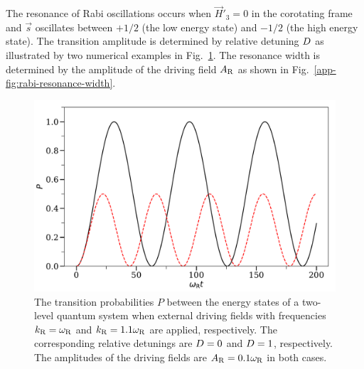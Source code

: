 The resonance of Rabi oscillations occurs when $\vec{H}'_3=0$ in the corotating frame and $\vec{s}$ oscillates between $+1/2$ (the low energy state) and $-1/2$ (the high energy state). The transition amplitude is determined by relative detuning $D$ as illustrated by two numerical examples in Fig.~\ref{app-fig:rabi-examples}. The resonance width is determined by the amplitude of the driving field $A_\mathrm R$ as shown in Fig.~\ref{app-fig:rabi-resonance-width}.

\begin{figure}[htbp]
    \centering
    \includegraphics[width=\textwidth]{chapters/assets/app/rabi-oscillations}
    \caption{The transition probabilities $P$ between the energy states of a two-level quantum system when external driving fields with frequencies $k_\mathrm R = \omega_\mathrm R$ and $k_\mathrm R=1.1\omega_\mathrm R$ are applied, respectively. The corresponding relative detunings are $D = 0$ and $D = 1$, respectively. The amplitudes of the driving fields are $A_\mathrm R=0.1\omega_\mathrm R$ in both cases. }
    \label{app-fig:rabi-examples}
\end{figure}



